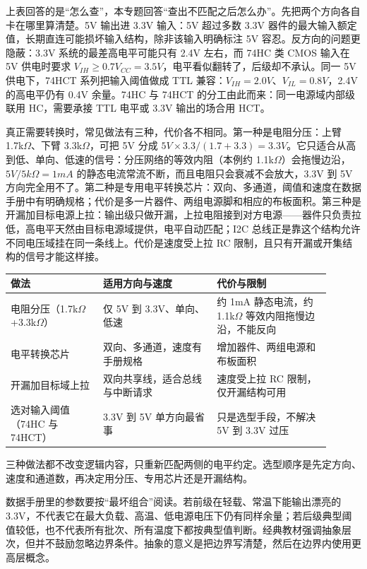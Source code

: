 上表回答的是“怎么查”，本专题回答“查出不匹配之后怎么办”。先把两个方向各自卡在哪里算清楚。5V 输出进 3.3V 输入：5V 超过多数 3.3V 器件的最大输入额定值，长期直连可能损坏输入结构，除非该输入明确标注 5V 容忍。反方向的问题更隐蔽：3.3V 系统的最差高电平可能只有 2.4V 左右，而 74HC 类 CMOS 输入在 5V 供电时要求 $V_{IH} \ge 0.7V_{CC} = 3.5V$，电平看似翻转了，后级却不承认。同一 5V 供电下，74HCT 系列把输入阈值做成 TTL 兼容：$V_{IH}=2.0V$、$V_{IL}=0.8V$，2.4V 的高电平仍有 0.4V 余量。74HC 与 74HCT 的分工由此而来：同一电源域内部级联用 HC，需要承接 TTL 电平或 3.3V 输出的场合用 HCT。

真正需要转换时，常见做法有三种，代价各不相同。第一种是电阻分压：上臂 1.7k$\Omega$、下臂 3.3k$\Omega$，可把 5V 分成 $5V \times 3.3/(1.7+3.3) = 3.3V$。它只适合从高到低、单向、低速的信号：分压网络的等效内阻（本例约 1.1k$\Omega$）会拖慢边沿，$5V/5k\Omega=1mA$ 的静态电流常流不断，而且电阻只会衰减不会放大，3.3V 到 5V 方向完全用不了。第二种是专用电平转换芯片：双向、多通道，阈值和速度在数据手册中有明确规格；代价是多一片器件、两组电源脚和相应的布板面积。第三种是开漏加目标电源上拉：输出级只做开漏，上拉电阻接到对方电源——器件只负责拉低，高电平天然由目标电源域提供，电平自动匹配；I2C 总线正是靠这个结构允许不同电压域挂在同一条线上。代价是速度受上拉 RC 限制，且只有开漏或开集结构的信号才能这样接。

\begin{longtable}{L{0.26\linewidth}L{0.32\linewidth}L{0.32\linewidth}}
\toprule
做法 & 适用方向与速度 & 代价与限制 \\
\midrule
电阻分压（1.7k$\Omega$+3.3k$\Omega$） & 仅 5V 到 3.3V、单向、低速 & 约 1mA 静态电流，约 1.1k$\Omega$ 等效内阻拖慢边沿，不能反向 \\
电平转换芯片 & 双向、多通道，速度有手册规格 & 增加器件、两组电源和布板面积 \\
开漏加目标域上拉 & 双向共享线，适合总线与中断请求 & 速度受上拉 RC 限制，仅开漏结构可用 \\
选对输入阈值（74HC 与 74HCT） & 3.3V 到 5V 单方向最省事 & 只是选型手段，不解决 5V 到 3.3V 过压 \\
\bottomrule
\end{longtable}

三种做法都不改变逻辑内容，只重新匹配两侧的电平约定。选型顺序是先定方向、速度和通道数，再决定用分压、专用芯片还是开漏结构。

数据手册里的参数要按“最坏组合”阅读。若前级在轻载、常温下能输出漂亮的 3.3V，不代表它在最大负载、高温、低电源电压下仍有同样余量；若后级典型阈值较低，也不代表所有批次、所有温度下都按典型值判断。经典教材强调抽象层次，但并不鼓励忽略边界条件。抽象的意义是把边界写清楚，然后在边界内使用更高层概念。

